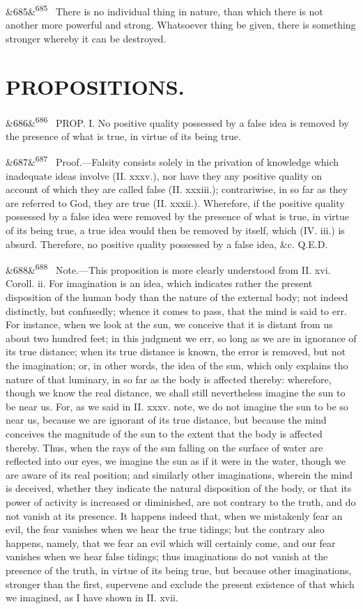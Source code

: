 \documentclass[12pt]{article}
\newcommand{\para}[1][]{\par\noindent\ifx&#1&\else\textsuperscript{\footnotesize #1}~\fi}
\begin{document}
\para[685] There is no individual thing in nature, than which there is not another more powerful and strong. Whatsoever thing be given, there is something stronger whereby it can be destroyed.

\section*{PROPOSITIONS.}

\para[686] PROP. I. No positive quality possessed by a false idea is removed by the presence of what is true, in virtue of its being true.

\para[687] Proof.---Falsity consists solely in the privation of knowledge which inadequate ideas involve (II. xxxv.), nor have they any positive quality on account of which they are called false (II. xxxiii.); contrariwise, in so far as they are referred to God, they are true (II. xxxii.). Wherefore, if the positive quality possessed by a false idea were removed by the presence of what is true, in virtue of its being true, a true idea would then be removed by itself, which (IV. iii.) is absurd. Therefore, no positive quality possessed by a false idea, \&c. Q.E.D.

\para[688] Note.---This proposition is more clearly understood from II. xvi. Coroll. ii. For imagination is an idea, which indicates rather the present disposition of the human body than the nature of the external body; not indeed distinctly, but confusedly; whence it comes to pass, that the mind is said to err. For instance, when we look at the sun, we conceive that it is distant from us about two hundred feet; in this judgment we err, so long as we are in ignorance of its true distance; when its true distance is known, the error is removed, but not the imagination; or, in other words, the idea of the sun, which only explains tho nature of that luminary, in so far as the body is affected thereby: wherefore, though we know the real distance, we shall still nevertheless imagine the sun to be near us. For, as we said in II. xxxv. note, we do not imagine the sun to be so near us, because we are ignorant of its true distance, but because the mind conceives the magnitude of the sun to the extent that the body is affected thereby. Thus, when the rays of the sun falling on the surface of water are reflected into our eyes, we imagine the sun as if it were in the water, though we are aware of its real position; and similarly other imaginations, wherein the mind is deceived, whether they indicate the natural disposition of the body, or that its power of activity is increased or diminished, are not contrary to the truth, and do not vanish at its presence. It happens indeed that, when we mistakenly fear an evil, the fear vanishes when we hear the true tidings; but the contrary also happens, namely, that we fear an evil which will certainly come, and our fear vanishes when we hear false tidings; thus imaginations do not vanish at the presence of the truth, in virtue of its being true, but because other imaginations, stronger than the first, supervene and exclude the present existence of that which we imagined, as I have shown in II. xvii.
\end{document}
